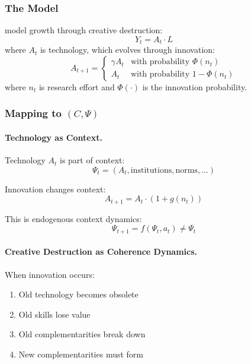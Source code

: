 \subsubsection{The Model}

\citet{aghionhowitt} model growth through creative destruction:
\begin{equation}
  Y_t = A_t \cdot L
  \label{eq:ahproduction}
\end{equation}
where $A_t$ is technology, which evolves through innovation:
\begin{equation}
  A_{t+1} = \begin{cases}
    \gamma A_t & \text{with probability } \Phi(n_t) \\
    A_t & \text{with probability } 1 - \Phi(n_t)
  \end{cases}
\end{equation}
where $n_t$ is research effort and $\Phi(\cdot)$ is the innovation probability.

\subsubsection{Mapping to $(C, \Psi)$}

\paragraph{Technology as Context.}
Technology $A_t$ is part of context:
\begin{equation}
  \Psi_t = (A_t, \text{institutions}, \text{norms}, \ldots)
\end{equation}

Innovation changes context:
\begin{equation}
  A_{t+1} = A_t \cdot (1 + g(n_t))
\end{equation}

This is endogenous context dynamics:
\begin{equation}
  \Psi_{t+1} = f(\Psi_t, a_t) \neq \Psi_t
\end{equation}

\paragraph{Creative Destruction as Coherence Dynamics.}
When innovation occurs:
\begin{enumerate}
  \item Old technology becomes obsolete
  \item Old skills lose value
  \item Old complementarities break down
  \item New complementarities must form
\end{enumerate}

